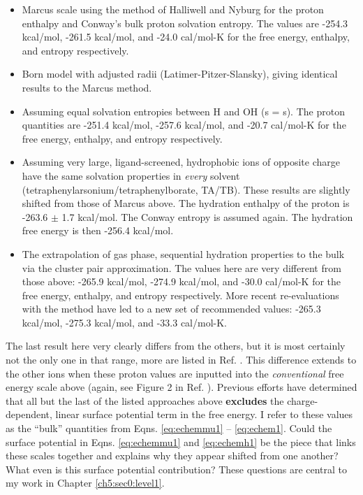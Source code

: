 \begin{intro}
   \begin{itemize}
       \item Marcus scale\cite{marcus1985book} using the method of Halliwell and Nyburg\cite{halliwell1963enthalpy} for the proton enthalpy and Conway's bulk proton solvation
       entropy\cite{conway1978evaluation}. The values are -254.3 kcal/mol, -261.5 kcal/mol, and -24.0 cal/mol-K for the free energy, enthalpy, and entropy respectively.
       \item Born model with adjusted radii (Latimer-Pitzer-Slansky)\cite{ashbaugh2008lps,latimer1939freenergy}, giving identical results to the Marcus method.
       \item Assuming equal solvation entropies between H\sur{+} and OH\sur{-} (s = s)\cite{schmid2000blkfe}. The proton 
        quantities are -251.4 kcal/mol, -257.6 kcal/mol, and -20.7 cal/mol-K for the free energy, enthalpy, and entropy respectively.
       \item Assuming very large, ligand-screened, hydrophobic ions of opposite charge  have the same solvation properties in \emph{every} solvent 
       (tetraphenylarsonium/tetraphenylborate, TA\sur{+}/TB\sur{-})\cite{marcus1987tatb}. These results are slightly shifted from those of Marcus above. The hydration enthalpy
       of the proton is -263.6 $\pm$ 1.7 kcal/mol. The Conway entropy is assumed again\cite{conway1978evaluation}. The hydration free energy is then -256.4 kcal/mol.
       \item The extrapolation of gas phase, sequential hydration properties to the bulk via the cluster pair approximation\cite{coe1998cpa1,coe2001cpa2,coe2002cpa3,kelly2006cpa}. 
       The values here are very different from those above: -265.9 kcal/mol, -274.9 kcal/mol, and -30.0 cal/mol-K for the free energy, enthalpy, and entropy respectively.
       More recent re-evaluations with the method have led to a new set of recommended values: -265.3 kcal/mol, -275.3 kcal/mol, and -33.3 cal/mol-K\cite{donald2010expand_cpa}.
   \end{itemize}
   
   The last result here very clearly differs from the others, but it is most certainly not the only one in that range, more are listed in Ref. \cite{ishikawa2016quantum}. This 
   difference extends to the other ions when these proton values are inputted into the \emph{conventional} free energy scale above (again, see Figure 2 in Ref. \cite{lamoureux2006absolute}). 
   Previous efforts have determined that all but the last of the listed approaches above \textbf{excludes} the charge-dependent, linear surface potential term in the free 
   energy\cite{asthagiri2003absolute,ashbaugh2008lps,beck2013sp,shi2013length}. I refer to these values as the ``bulk'' quantities from Eqns. \ref{eq:echemmu1} -- \ref{eq:echem1}. 
   Could the surface potential in Eqns. \ref{eq:echemmu1} and \ref{eq:echemh1} be the piece that links these scales together and explains why they appear shifted from one another? 
   What even is this surface potential contribution? These questions are central to my work in Chapter \ref{ch5:sec0:level1}.


\end{intro}
